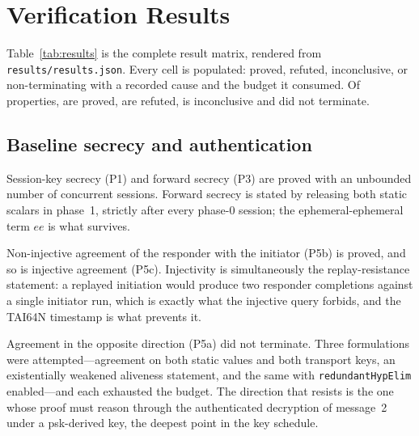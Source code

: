 \section{Verification Results}
\label{sec:results}

Table~\ref{tab:results} is the complete result matrix, rendered from
\texttt{results/results.json}. Every cell is populated: proved, refuted,
inconclusive, or non-terminating with a recorded cause and the budget it
consumed. Of \wgProps{} properties, \wgProved{} are proved, \wgAttacks{} are
refuted, \wgInconcl{} is inconclusive and \wgNonterm{} did not terminate.

\begin{table}[t]
\centering
\caption{Verification outcomes, the complete matrix. \wgProVerif{} and
\wgTamarin, single core, \wgMemCap\,GB address-space cap, \wgBudget\,s
wall-clock budget. \(\dagger\) marks a budget consumed without reaching a
verdict, which is not a time-to-verdict and must not be read as one; \emph{n/r}
marks a run that predates per-query cost recording. Every cell is rendered
from \texttt{results/results.json}.}
\label{tab:results}
\footnotesize

\end{table}

\subsection{Baseline secrecy and authentication}

 Session-key secrecy (P1) and forward secrecy (P3) are proved
with an unbounded number of concurrent sessions. Forward secrecy is stated by
releasing both static scalars in phase~1, strictly after every phase-0
session; the ephemeral-ephemeral term \(ee\) is what survives.

 Non-injective agreement of the
responder with the initiator (P5b) is proved, and so is injective agreement
(P5c). Injectivity is simultaneously the replay-resistance statement: a
replayed initiation would produce two responder completions against a single
initiator run, which is exactly what the injective query forbids, and the
TAI64N timestamp is what prevents it.

 Agreement in the opposite direction (P5a)
did not terminate. Three formulations were attempted---agreement on both
static values and both transport keys, an existentially weakened aliveness
statement, and the same with \texttt{redundantHypElim} enabled---and each
exhausted the budget. The direction that resists is the one whose proof must
reason through the authenticated decryption of message~2 under a psk-derived
key, the deepest point in the key schedule.

